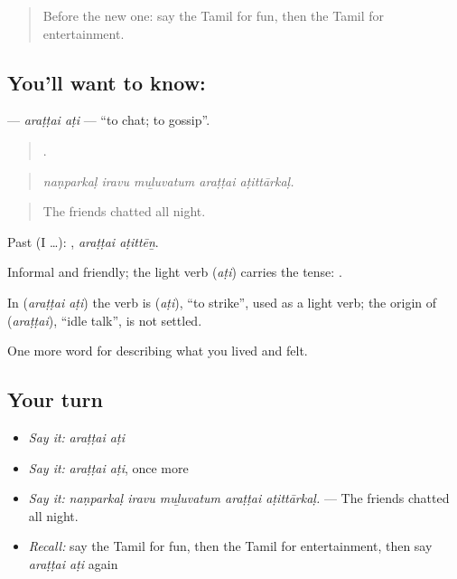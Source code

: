 \label{lesson:TA-C527-arattai-ati}



\begin{quote}
Before the new one: say the Tamil for fun, then the Tamil for entertainment.
\end{quote}

\subsection*{You'll want to know:  }
\textbf{ } — \emph{araṭṭai aṭi} — \textquotedblleft{}to chat; to gossip\textquotedblright{}.

\begin{quote}
    .
\end{quote}

\begin{quote}
\emph{naṇparkaḷ iravu muḻuvatum araṭṭai aṭittārkaḷ.}
\end{quote}

\begin{quote}
The friends chatted all night.
\end{quote}

Past (I …):  , \emph{araṭṭai aṭittēṉ}.

Informal and friendly; the light verb  (\emph{aṭi}) carries the tense:  .

\begin{cousinweb}
In \textbf{ } (\emph{araṭṭai aṭi}) the verb is  (\emph{aṭi}), \textquotedblleft{}to strike\textquotedblright{}, used as a light verb; the origin of  (\emph{araṭṭai}), \textquotedblleft{}idle talk\textquotedblright{}, is not settled.
\end{cousinweb}

\begin{grammarlens}[title={What you've built}]
One more word for describing what you lived and felt.
\end{grammarlens}

\subsection*{Your turn}
\begin{itemize}
\raggedright
  \item \emph{Say it:} \emph{araṭṭai aṭi}
  \item \emph{Say it:} \emph{araṭṭai aṭi}, once more
  \item \emph{Say it:} \emph{naṇparkaḷ iravu muḻuvatum araṭṭai aṭittārkaḷ.} — The friends chatted all night.
  \item \emph{Recall:} say the Tamil for fun, then the Tamil for entertainment, then say \emph{araṭṭai aṭi} again
\end{itemize}

